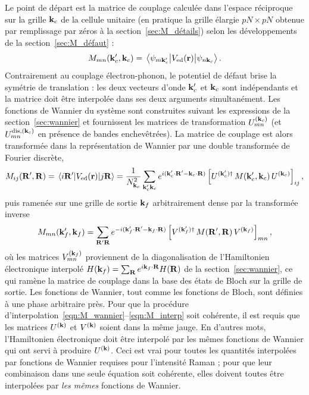 Le point de départ est la matrice de couplage calculée dans l'espace
réciproque sur la grille $\mathbf{k}_c$ de la cellule unitaire (en pratique la grille
élargie $pN\times pN$ obtenue par remplissage par zéros à la
section~\ref{sec:M_détails}) selon
les développements de la section~\ref{sec:M_défaut} :
\begin{equation}
    M_{mn}(\kv_c',\kv_c) = \matrixel{\psi_{m\kv_c'}}{V_\text{ed}(\rv)}{\psi_{n\kv_c}}.
\end{equation}
Contrairement au couplage électron-phonon, le potentiel de défaut brise la symétrie de translation : les deux vecteurs d'onde $\mathbf{k}_c'$ et
$\mathbf{k}_c$ sont indépendants et la matrice doit être interpolée dans ses
deux arguments simultanément. Les fonctions de Wannier du système sont construites suivant les expressions de la section~\ref{sec:wannier} et fournissent les matrices de transformation $U^{(\mathbf{k}_c)}_{mn}$ (et $U^{\text{dis},(\mathbf{k}_c)}_{mn}$ en présence de
bandes enchevêtrées). La matrice de couplage est alors transformée dans
la représentation de Wannier par une double transformée de Fourier
discrète,
\begin{equation}
    M_{ij}(\Rv',\Rv) = \matrixel{i\Rv'}{V_\text{ed}(\rv)}{j\Rv}
    = \frac{1}{N_{\kv_c}^2}\sum_{\kv_c'\kv_c}
    e^{i(\kv_c'\cdot\Rv'-\kv_c\cdot\Rv)}
    \left[U^{(\kv_c')\dag}\,M(\kv_c',\kv_c)\,U^{(\kv_c)}\right]_{ij},
    \label{eqn:M_wannier}
\end{equation}
puis ramenée sur une grille de sortie $\mathbf{k}_f$ arbitrairement dense par la transformée inverse
\begin{equation}
    M_{mn}(\mathbf{k}_f',\mathbf{k}_f) = \sum_{\mathbf{R}'\mathbf{R}}
    e^{-i(\mathbf{k}_f'\cdot\mathbf{R}'-\mathbf{k}_f\cdot\mathbf{R})}
    \left[V^{(\mathbf{k}_f')\dag}\,M(\mathbf{R}',\mathbf{R})\,V^{(\mathbf{k}_f)}\right]_{mn},
    \label{eqn:M_interp}
\end{equation}
où les matrices $V^{(\mathbf{k}_f)}_{mn}$ proviennent de la diagonalisation de l'Hamiltonien électronique interpolé $H(\mathbf{k}_f) = \sum_{\mathbf{R}} e^{i\mathbf{k}_f\cdot\mathbf{R}} H(\mathbf{R})$ de la section~\ref{sec:wannier}, ce qui ramène la matrice de couplage dans la base des états de Bloch sur la grille de sortie. Les fonctions de Wannier, tout comme les fonctions de Bloch, sont définies à une phase arbitraire près. Pour que la procédure d'interpolation~\eqref{eqn:M_wannier}--\eqref{eqn:M_interp} soit cohérente, il est requis que les matrices $U^{(\mathbf{k})}$ et $V^{(\mathbf{k})}$ soient dans la même jauge. En d'autres mots, l'Hamiltonien électronique doit être interpolé par les mêmes fonctions de Wannier qui ont servi à produire $U^{(\mathbf{k})}$. Ceci est vrai pour toutes les quantités interpolées par fonctions de Wannier requises pour l'intensité Raman ; pour que leur combinaison dans une seule équation soit cohérente, elles doivent toutes être interpolées par \textit{les mêmes} fonctions de Wannier.

